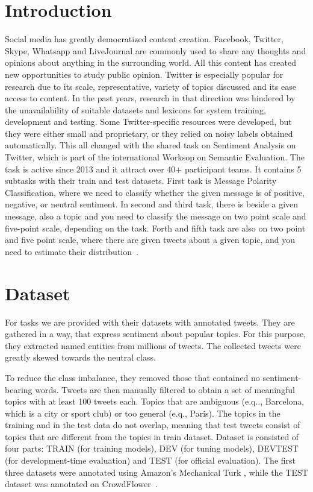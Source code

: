 \documentclass[runningheads,a4paper]{llncs}
\begin{document}
\section{Introduction}
Social media has greatly democratized content creation. Facebook, Twitter, Skype, Whatsapp and LiveJournal are commonly used to share any thoughts and opinions about anything in the surrounding world. All this content has created new opportunities to study public opinion. Twitter is especially popular for research due to its scale, representative, variety of topics discussed and its ease access to content. In the past years, research in that direction was hindered by the unavailability of suitable datasets and lexicons for system training, development and testing. Some Twitter-specific resources were developed, but they were either small and proprietary, or they relied on noisy labels obtained automatically. This all changed with the shared task on Sentiment Analysis on Twitter, which is part of the international Worksop on Semantic Evaluation. The task is active since 2013 and it attract over 40+ participant teams. It contains 5 subtasks with their train and test datasets. First task is Message Polarity Classification, where we need to classify whether the given message is of positive, negative, or neutral sentiment. In second and third task, there is beside a given message, also a topic and you need to classify the message on two point scale and five-point scale, depending on the task. Forth and fifth task are also on two point and five point scale, where there are given tweets about a given topic, and you need to estimate their distribution~\cite{semeval}.

\section{Dataset}
 For tasks we are provided with their datasets with annotated tweets. They are gathered in a way, that express sentiment about popular topics. For this purpose, they extracted named entities from millions of tweets. The collected tweets were greatly skewed towards the neutral class. 
 
 To reduce the class imbalance, they removed those that contained no sentiment-bearing words. Tweets are then manually filtered to obtain a set of meaningful topics with at least 100 tweets each. Topics that are ambiguous (e.q.., Barcelona, which is a city or sport club) or too general (e.q., Paris). The topics in the training and in the test data do not overlap, meaning that test tweets consist of topics that are different from the topics in train dataset. Dataset is consisted of four parts: TRAIN (for training models), DEV (for tuning models), DEVTEST (for development-time evaluation) and TEST (for official evaluation). The first three datasets were annotated using Amazon's Mechanical Turk , while the TEST dataset was annotated on CrowdFlower~\cite{semeval}.
 
\end{document}

